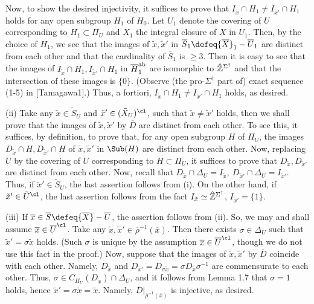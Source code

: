 Now, to show the desired injectivity, 
it suffices to prove that
$I_{\tilde x}\cap H_1 \neq I_{{\tilde x}'}\cap H_1$ holds 
for any open subgroup $H_1$ of $H_0$. 
Let $U_1$ denote the 
covering of $U$ corresponding to $H_1\subset\Pi_U$ 
and $X_1$ the integral closure of $X$ in $U_1$. Then, by the 
choice of $H_1$, we see that the images 
of ${\tilde x}, {\tilde x}'$ in 
${\overline S}_1\defeq{\overline X}_1-{\overline U}_1$ are distinct from each other 
and that the cardinality of ${\overline S}_1$ is $\geq 3$. Then 
it is easy to see that the images of 
$I_{\tilde x}\cap H_1,I_{{\tilde x}'}\cap H_1$ 
in ${\overline H}_1^{\operatorname {ab}}$ are isomorphic to ${\hat {\Bbb Z}}^{\Sigma^{\dag}}$ 
and that the intersection of these images is $\{0\}$. 
(Observe (the pro-$\Sigma^{\dag}$ part of) 
exact sequence (1-5) in [Tamagawa1].) Thus, 
a fortiori, $I_{\tilde x}\cap H_1 \neq I_{{\tilde x}'}\cap H_1$ holds, 
as desired. 

\noindent
(ii) Take any ${\tilde x}\in {\tilde S}_U$ 
and ${\tilde x}'\in({\tilde X}_U)^{\cl}$, 
such that ${\tilde x}\neq {\tilde x}'$ holds, 
then we shall prove that the images of
${\tilde x},{\tilde x}'$ by $\overline{D}$ 
are distinct from each other. To see this, 
it suffices, by definition, to prove that, for any open subgroup 
$H$ of $\Pi_U$, the images 
$D_{\tilde x}\cap H,D_{{\tilde x}'}\cap H$
of ${\tilde x},{\tilde x}'$ 
in $\Sub(H)$ are distinct from each other. Now, replacing 
$U$ by the covering of $U$ corresponding to $H\subset \Pi_U$, 
it suffices to prove that 
$D_{\tilde x},D_{{\tilde x}'}$ are distinct from each other. 
Now, recall that
$D_{\tilde x}\cap \Delta_U=I_{\tilde x},\  
D_{{\tilde x}'}\cap \Delta_U=I_{{\tilde x}'}.$
Thus, if ${\tilde x}'\in {\tilde S}_U$, 
the last assertion follows from (i). On the other hand, 
if ${\tilde x}'\in {\tilde U}^{\cl}$, the last assertion 
follows from the fact 
$I_{\tilde x}\simeq 
{\hat {\Bbb Z}}^{\Sigma^{\dag}}$, $I_{{\tilde x}'}=\{1\}$. 

\noindent
(iii) If ${\overline x}\in {\overline S}\defeq{\overline X}-{\overline U}$, 
the assertion 
follows from (ii). So, we may and shall 
assume ${\overline x}\in {\overline U}^{\cl}$. 
Take any ${\tilde x}, {\tilde x}' \in {\overline \rho}^{-1}({\overline x})$. 
Then there exists $\sigma\in\Delta_U$ such that 
${\tilde x}'=\sigma{\tilde x}$ holds. 
(Such $\sigma$ is unique by the assumption 
${\overline x}\in {\overline U}^{\cl}$, though we do not use this fact 
in the proof.) 
Now, suppose that the images of ${\tilde x}, {\tilde x}'$ 
by $\overline{D}$ coincide with each other. Namely, 
$D_{\tilde x}$ and 
$D_{{\tilde x}'}=D_{\sigma{\tilde x}}=\sigma D_{\tilde x}\sigma^{-1}$ 
are commensurate to each other. Thus, $\sigma\in C_{\Pi_U}(D_{\tilde x}) 
\cap \Delta_U$, and it follows from Lemma 1.7 that $\sigma=1$ holds, hence 
${\tilde x}'=\sigma{\tilde x}={\tilde x}$. 
Namely, $\overline{D}|_{{\overline \rho}^{-1}({\overline x})}$ is injective, 
as desired. 

